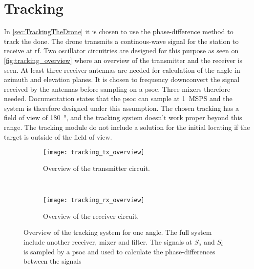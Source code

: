 \graphicspath{{figures/design/tracking/}}
\chapter{Tracking}\label{ch:design:Tracking}

In \autoref{sec:TrackingTheDrone} it is chosen to use the phase-difference method to track the done. 
The drone transmits a continous-wave signal for the station to receive at \gls{rf}. Two oscillator circuitries are designed for this purpose as seen on \autoref{fig:tracking_overview} where an overview of the transmitter and the receiver is seen. At least three receiver antennas are needed for calculation of the angle in azimuth and elevation planes. It is chosen to frequency downconvert the signal received by the antennas before sampling on a \gls{psoc}. Three mixers therefore needed. Documentation states that the \gls{psoc} can sample at \SI{1}{MSPS} \cite{datasheet:saradc} and the system is therefore designed under this assumption. The chosen tracking has a field of view of \SI{180}{\degree}, and the tracking system doesn't work proper beyond this range. The tracking module do not include a solution for the initial locating if the target is outside of the field of view.

\begin{figure}[h]
	\centering
	\begin{subfigure}[b]{0.4\textwidth}
		\texttt{[image: tracking\_tx\_overview]}
		\caption{Overview of the transmitter circuit.}
		\label{fig:tracking_transmitter_overview}
	\end{subfigure}
	~ 
	\begin{subfigure}[b]{0.35\textwidth}
		\texttt{[image: tracking\_rx\_overview]}
		\caption{Overview of the receiver circuit.}
		\label{fig:tracking_receiver_overview}
	\end{subfigure}

	\caption{Overview of the tracking system for one angle. The full system include another receiver, mixer and filter. The signals at $S_a$ and $S_b$ is sampled by a \gls{psoc} and used to calculate the phase-differences between the signals}
	\label{fig:tracking_overview}
\end{figure}







